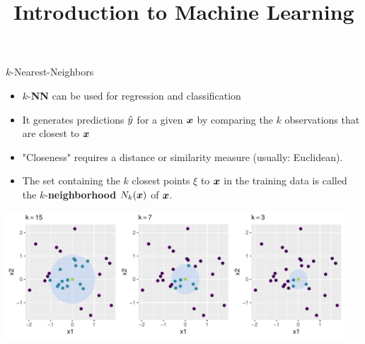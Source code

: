 \documentclass[11pt,compress,t,notes=noshow, xcolor=table]{beamer}
\title{Introduction to Machine Learning}
\institute{\href{https://compstat-lmu.github.io/lecture_i2ml/}{compstat-lmu.github.io/lecture\_i2ml}}
\date{}
\newenvironment{knitrout}{}{} %
\begin{document}



















\begin{vbframe}{$k$-Nearest-Neighbors}

\begin{itemize}
\item $k$-\textbf{NN} can be used for regression and classification
\item It generates predictions $\hat{y}$ for a given $\bm{x}$ by comparing the $k$ observations that are closest to $\bm{x}$
\item "Closeness" requires a distance or similarity measure (usually: Euclidean).
\item The set containing the $k$ closest points $\xi$ to $\bm{x}$ in the training data is called  the $k$-\textbf{neighborhood} $N_k(\bm{x})$ of $\bm{x}$.
\end{itemize}


\begin{knitrout}\scriptsize
{}\color{fgcolor}

{\centering \includegraphics[width=0.95\textwidth]{figure/reg_knn_1} 

}



\end{knitrout}

\end{vbframe}
\end{document}
